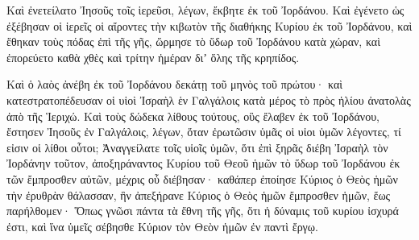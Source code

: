 {Καὶ ἐνετείλατο Ἰησοῦς τοῖς ἱερεῦσι, λέγων, ἔκβητε ἐκ τοῦ Ἰορδάνου.
Καὶ ἐγένετο ὡς ἐξέβησαν οἱ ἱερεῖς οἱ αἴροντες τὴν κιβωτὸν τῆς διαθήκης Κυρίου ἐκ τοῦ Ἰορδάνου, καὶ ἔθηκαν τοὺς πόδας ἐπὶ τῆς γῆς, ὥρμησε τὸ ὕδωρ τοῦ Ἰορδάνου κατὰ χώραν, καὶ ἐπορεύετο καθὰ χθὲς καὶ τρίτην ἡμέραν διʼ ὅλης τῆς κρηπίδος.
\par }{\PP {}Καὶ ὁ λαὸς ἀνέβη ἐκ τοῦ Ἰορδάνου δεκάτῃ τοῦ μηνὸς τοῦ πρώτου· καὶ κατεστρατοπέδευσαν οἱ υἱοὶ Ἰσραὴλ ἑν Γαλγάλοις κατὰ μέρος τὸ πρὸς ἡλίου ἀνατολὰς ἀπὸ τῆς Ἱεριχώ.
Καὶ τοὺς δώδεκα λίθους τούτους, οὓς ἔλαβεν ἐκ τοῦ Ἰορδάνου, ἔστησεν Ἰησοῦς ἐν Γαλγάλοις,
λέγων, ὅταν ἐρωτῶσιν ὑμᾶς οἱ υἱοι ὑμῶν λέγοντες, τί εἰσιν οἱ λίθοι οὗτοι;
Ἀναγγείλατε τοῖς υἱοῖς ὑμῶν, ὅτι ἐπὶ ξηρᾶς διέβη Ἰσραὴλ τὸν Ἰορδάνην τοῦτον,
ἀποξηράναντος Κυρίου τοῦ Θεοῦ ἡμῶν τὸ ὕδωρ τοῦ Ἰορδάνου ἐκ τῶν ἔμπροσθεν αὐτῶν, μέχρις οὗ διέβησαν· καθάπερ ἐποίησε Κύριος ὁ Θεὸς ἡμῶν τὴν ἐρυθρὰν θάλασσαν, ἣν ἀπεξήρανε Κύριος ὁ Θεὸς ἡμῶν ἔμπροσθεν ἡμῶν, ἕως παρήλθομεν·
Ὅπως γνῶσι πάντα τὰ ἔθνη τῆς γῆς, ὅτι ἡ δύναμις τοῦ κυρίου ἰσχυρά ἐστι, καὶ ἵνα ὑμεῖς σέβησθε Κύριον τὸν Θεὸν ἡμῶν ἐν παντὶ ἔργῳ.

}
